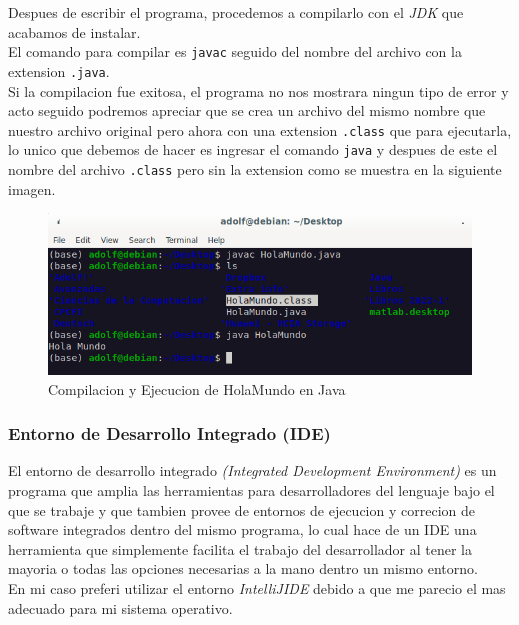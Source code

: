 \documentclass{article}
\begin{document}
			Despues de escribir el programa, procedemos a compilarlo con el \emph{JDK} que acabamos de instalar.\\
			
			El comando para compilar es \verb*|javac| seguido del nombre del archivo con la extension \verb*|.java|.\\
			
			Si la compilacion fue exitosa, el programa no nos mostrara ningun tipo de error y acto seguido podremos apreciar que se crea un archivo del mismo nombre que nuestro archivo original pero ahora con una extension \verb*|.class| que para ejecutarla, lo unico que debemos de hacer es ingresar el comando \verb*|java| y despues de este el nombre del archivo \verb*|.class| pero sin la extension como se muestra en la siguiente imagen.
			
			\begin{figure}[H]
				\centering
				\includegraphics[scale = 0.5]{images/holamundocomp}
				\caption{Compilacion y Ejecucion de HolaMundo en Java}
			\end{figure}
		
		\subsubsection{Entorno de Desarrollo Integrado (IDE)}
		
		El entorno de desarrollo integrado \emph{(Integrated Development Environment)} es un programa que amplia las herramientas para desarrolladores del lenguaje bajo el que se trabaje y que tambien provee de entornos de ejecucion y correcion de software integrados dentro del mismo programa, lo cual hace de un IDE una herramienta que simplemente facilita el trabajo del desarrollador al tener la mayoria o todas las opciones necesarias a la mano dentro un mismo entorno.\\
		
		En mi caso preferi utilizar el entorno \emph{IntelliJIDE} debido a que me parecio el mas adecuado para mi sistema operativo.
		
\end{document}
